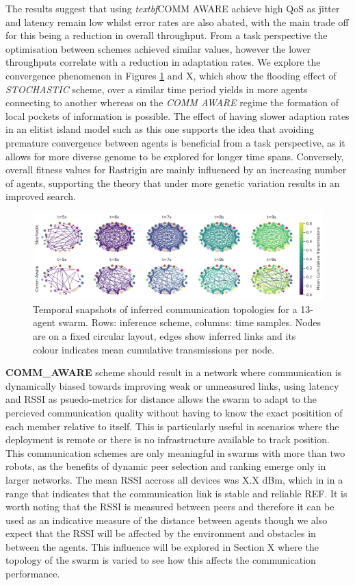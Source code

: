 \documentclass[conference]{IEEEtran}
\begin{document}
The results suggest that using \emph{textbf}{COMM AWARE} achieve high QoS as jitter and latency remain low whilst error rates are also abated, with the main trade off for this being a reduction in overall throughput. From a task perspective the optimisation between schemes achieved similar values, however the lower throughputs correlate with a reduction in adaptation rates. We explore the convergence phenomenon in Figures \ref{fig:convergence} and X, which show the flooding effect of \emph{STOCHASTIC} scheme, over a similar time period yields in more agents connecting to another whereas on the \emph{COMM AWARE} regime the formation of local pockets of information is possible. The effect of having slower adaption rates in an elitist island model such as this one supports the idea that avoiding premature convergence between agents is beneficial from a task perspective, as it allows for more diverse genome to be explored for longer time spans. Conversely, overall fitness values for Rastrigin are mainly influenced by an increasing number of agents, supporting the theory that under more genetic variation results in an improved search.

\begin{figure}[h]
    \centering
    \includegraphics[width=1\textwidth]{convergence_impact.pdf}
    \caption{Temporal snapshots of inferred communication topologies for a 13-agent swarm. Rows: inference scheme, columns: time samples. Nodes are on a fixed circular layout, edges show inferred links and its colour indicates mean cumulative transmissions per node.}
    \label{fig:convergence}
\end{figure}


\textbf{COMM\_AWARE} scheme should result in a network where communication is dynamically biased towards improving weak or unmeasured links, using latency and RSSI as psuedo-metrics for distance allows the swarm to adapt to the percieved communication quality without having to know the exact positition of each member relative to itself. This is particularly useful in scenarios where the deployment is remote or there is no infrastructure available to track position. This communication schemes are only meaningful in swarms with more than two robots, as the benefits of dynamic peer selection and ranking emerge only in larger networks. The mean RSSI accross all devices was X.X dBm, which in in a range that indicates that the communication link is stable and reliable REF. It is worth noting that the RSSI is measured between peers and therefore it can be used as an indicative measure of the distance between agents though we also expect that the RSSI will be affected by the environment and obstacles in between the agents. This influence will be explored in Section X where the topology of the swarm is varied to see how this affects the communication performance.\\
\end{document}
